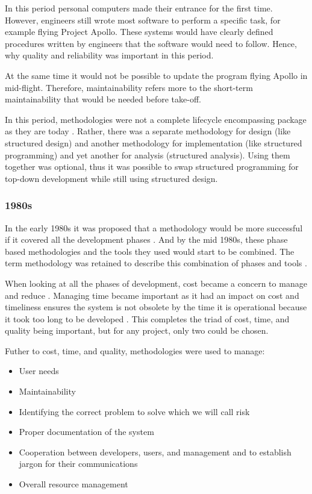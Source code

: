 In this period personal computers made their entrance for the first time.
However, engineers still wrote most software to perform a specific task, for example flying Project Apollo.
These systems would have clearly defined procedures written by engineers that the software would need to follow.
Hence, why quality and reliability was important in this period.

At the same time it would not be possible to update the program flying Apollo in mid-flight. 
Therefore, maintainability refers more to the short-term maintainability that would be needed before take-off.

In this period, methodologies were not a complete lifecycle encompassing package as they are today \cite{soi_1982, beregi_1985}.
Rather, there was a separate methodology for design (like structured design) and another methodology for implementation (like structured programming) and yet another for analysis (structured analysis).
Using them together was optional, thus it was possible to swap structured programming for top-down development while still using structured design. \cite{yourdon_1977}

\subsubsection{1980s}
In the early 1980s it was proposed that a methodology would be more successful if it covered all the development phases \cite{soi_1982}.
And by the mid 1980s, these phase based methodologies and the tools they used would start to be combined.
The term methodology was retained to describe this combination of phases and tools \cite{beregi_1985}. 

When looking at all the phases of development, cost became a concern to manage and reduce \cite{vanderlei_1983, peacham_1985, loesh_1985}.
Managing time became important as it had an impact on cost and timeliness ensures the system is not obsolete by the time it is operational because it took too long to be developed \cite{peacham_1985, beregi_1985, mannino_1987, paul_1993}.
This completes the triad of cost, time, and quality being important, but for any project, only two could be chosen.

Futher to cost, time, and quality, methodologies were used to manage:
\begin{itemize}
    \item User needs \cite{peacham_1985}
    \item Maintainability \cite{peacham_1985}
    \item Identifying the correct problem to solve which we will call risk \cite{peacham_1985}
    \item Proper documentation of the system \cite{loesh_1985}
    \item Cooperation between developers, users, and management and to establish jargon for their communications \cite{loesh_1985}
    \item Overall resource management \cite{mannino_1987}
\end{itemize}

